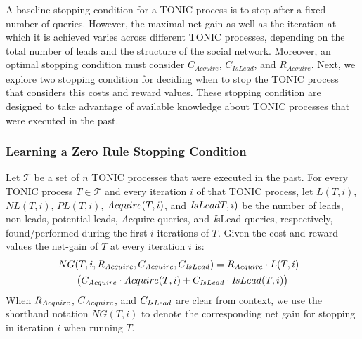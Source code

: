 \documentclass[journal]{IEEEtran}
\newcommand{\IsLead}[1]{{\textit IsLead}}
\newcommand{\Acquire}{{\textit Acquire}}
\begin{document}
A baseline stopping condition for a TONIC process is to stop after a fixed number of queries. However, the maximal net gain as well as the iteration at which it is achieved varies across  different TONIC processes, depending on the total number of leads and the structure of the social network. Moreover, an optimal stopping condition must consider $C_{Acquire}$, $C_{IsLead}$, and $R_{Acquire}$. Next, we explore two stopping condition for deciding when to stop the TONIC process that considers this costs and reward values.  
These stopping condition are designed to take advantage of available knowledge about TONIC processes that were executed in the past. 

\subsubsection{Learning a Zero Rule Stopping Condition}


Let $\mathcal{T}$ be a set of $n$  TONIC processes that were executed in the past. 
For every TONIC process $T\in \mathcal{T}$ and every iteration $i$ of that TONIC process, let $L(T,i)$, 
$NL(T,i)$, 
$PL(T,i)$, 
$\Acquire(T,i)$, 
and $\IsLead(T,i)$ be 
the number of leads, 
non-leads, 
potential leads, 
\Acquire{} queries, 
and \IsLead{} queries, respectively, 
found/performed during the first $i$ iterations of $T$. 
Given the cost and reward values the 
net-gain of $T$ at every iteration $i$ is: 
\begin{multline}
NG(T,i, R_{\Acquire{}}, C_{\Acquire{}}, C_{\IsLead{}}) =
R_{\Acquire}\cdot L(T,i) - \\
\big(C_{\Acquire}\cdot \Acquire{}(T,i) +
C_{\IsLead{}}\cdot \IsLead{}(T,i) \big)
\end{multline}
When $R_{\Acquire{}}$, $C_{\Acquire{}}$, and $C_{\IsLead{}}$ are clear from context, we use the shorthand notation $NG(T,i)$ to denote the corresponding net gain for stopping in iteration $i$ when running $T$. 
\end{document}
